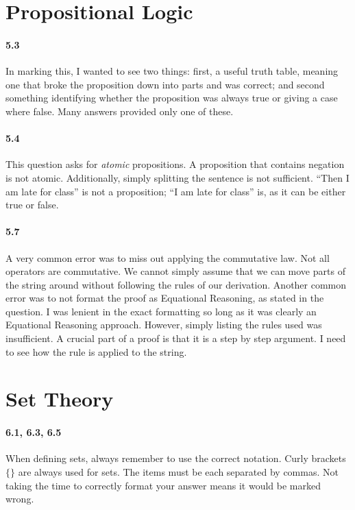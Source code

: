 \documentclass{article}
\begin{document}
\section{Propositional Logic}

\paragraph{5.3} In marking this, I wanted to see two things: first, a useful truth table, meaning one that broke the proposition down into parts and was correct; and second something identifying whether the proposition was always true or giving a case where false. Many answers provided only one of these.

\paragraph{5.4} This question asks for \emph{atomic} propositions. A proposition that contains negation is not atomic. Additionally, simply splitting the sentence is not sufficient. ``Then I am late for class'' is not a proposition; ``I am late for class'' is, as it can be either true or false.

\paragraph{5.7} A very common error was to miss out applying the commutative law. Not all operators are commutative. We cannot simply assume that we can move parts of the string around without following the rules of our derivation. Another common error was to not format the proof as Equational Reasoning, as stated in the question. I was lenient in the exact formatting so long as it was clearly an Equational Reasoning approach. However, simply listing the rules used was insufficient. A crucial part of a proof is that it is a step by step argument. I need to see how the rule is applied to the string.

\section{Set Theory}

\paragraph{6.1, 6.3, 6.5} When defining sets, always remember to use the correct notation. Curly brackets $\{ \}$ are always used for sets. The items must be each separated by commas. Not taking the time to correctly format your answer means it would be marked wrong.
\end{document}
